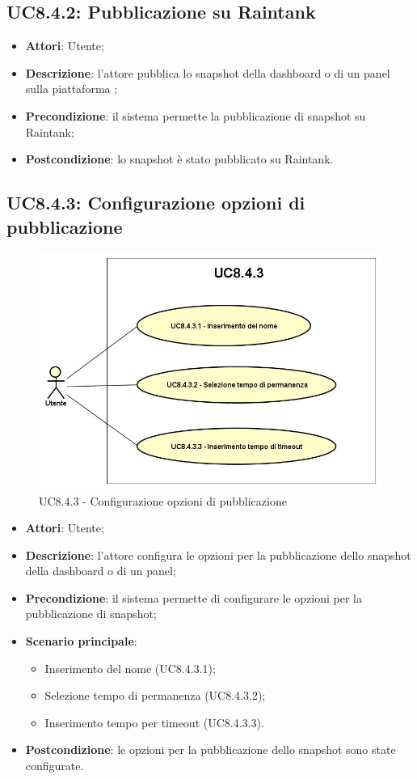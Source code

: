 \subsection{UC8.4.2: Pubblicazione su Raintank}
\hypertarget{UC8.4.2}{}
\begin{itemize}
	\item \textbf{Attori}: Utente;
	\item \textbf{Descrizione}: l'attore pubblica lo snapshot della dashboard o di un panel sulla piattaforma ;
	\item \textbf{Precondizione}: il sistema permette la pubblicazione di snapshot su Raintank;
	\item \textbf{Postcondizione}: lo snapshot è stato pubblicato su Raintank.
\end{itemize}

\subsection{UC8.4.3: Configurazione opzioni di pubblicazione}
\hypertarget{UC8.4.3}{}
\begin{figure} [H]
	\centering
	\includegraphics[scale=0.45]{Img/UC8-4-3}
	\caption{UC8.4.3 - Configurazione opzioni di pubblicazione}\label{}
\end{figure}
\begin{itemize}
	\item \textbf{Attori}: Utente;
	\item \textbf{Descrizione}: l'attore configura le opzioni per la pubblicazione dello snapshot della dashboard o di un panel;
	\item \textbf{Precondizione}: il sistema permette di configurare le opzioni per la pubblicazione di snapshot;
	\item \textbf{Scenario principale}:
	\begin{itemize}
		\item Inserimento del nome (UC8.4.3.1);
		\item Selezione tempo di permanenza (UC8.4.3.2);
		\item Inserimento tempo per timeout (UC8.4.3.3).
	\end{itemize}
	\item \textbf{Postcondizione}: le opzioni per la pubblicazione dello snapshot sono state configurate.
\end{itemize}

